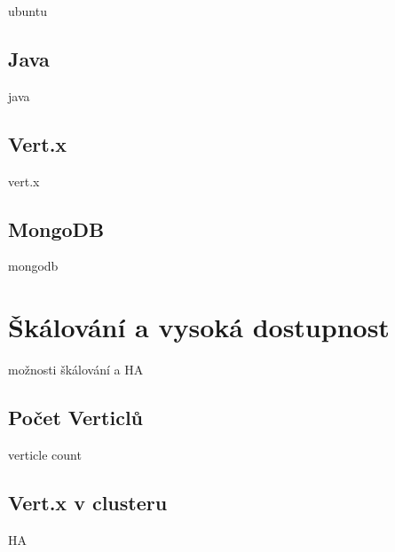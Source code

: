ubuntu

\subsection{Java}

java

\subsection{Vert.x}

vert.x

\subsection{MongoDB}

mongodb

\section{Škálování a vysoká dostupnost}\label{sub:Scaling}

možnosti škálování a HA

\subsection{Počet Verticlů}
verticle count

\subsection{Vert.x v clusteru}
HA
